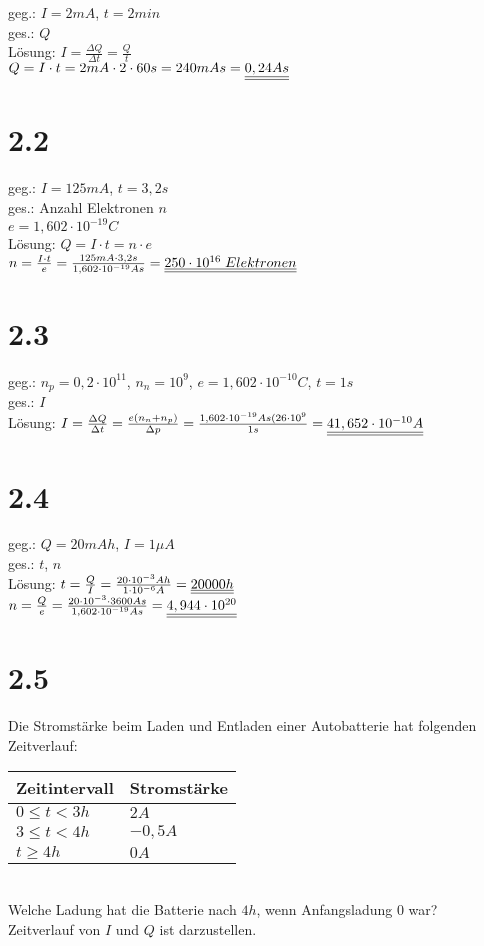 geg.: $I=2mA$, $t=2 min$\\
ges.: $Q$\\
Lösung: $\boxed{I=\frac{\Delta Q}{\Delta t}=\frac{Q}{t}}$\\
$Q=I\cdot t=2mA \cdot 2 \cdot 60s = 240 mAs = \underline{\underline{0,24 As}}$

\section*{2.2}

geg.: $I=125mA$, $t=3,2s$\\
ges.: Anzahl Elektronen $n$\\
$e = 1,602 \cdot 10^{-19}C$\\
Lösung: $Q=I\cdot t=n\cdot e$\\
$n=\frac{I\cdot t}{e}=\frac{125mA \cdot 3,2s}{1,602\cdot 10^{-19}As}=\underline{\underline{250\cdot 10^{16}\; Elektronen}}$

\section*{2.3}

geg.: $n_p=0,2\cdot 10^{11}$, $n_n=10^9$, $e=1,602\cdot 10^{-10} C$, $t=1s$\\
ges.: $I$\\
Lösung: $I=\frac{\Delta Q}{\Delta t}=\frac{e(n_n+n_p)}{\Delta p}=\frac{1,602\cdot 10^{-19}As(26\cdot 10^9}{1s}=\underline{\underline{41,652 \cdot 10^{-10}A}}$

\section*{2.4}

geg.: $Q=20mAh$, $I=1 \mu A$\\
ges.: $t$, $n$\\
Lösung: $t=\frac{Q}{I}=\frac{20\cdot 10^{-3}Ah}{1 \cdot 10^{-6}A}=\underline{\underline{20000h}}$\\
$n=\frac{Q}{e}=\frac{20\cdot 10^{-3}\cdot 3600 As}{1,602\cdot 10^{-19} As}=\underline{\underline{4,944\cdot 10^{20}}}$

\section*{2.5}
Die Stromstärke beim Laden und Entladen einer Autobatterie hat folgenden Zeitverlauf:\\
\begin{tabular}{l | l}
Zeitintervall & Stromstärke \\
\hline
$0 \leq t < 3h$ & $2A$\\
$3 \leq t < 4h$ & $-0,5A$\\
$t\geq 4h$ & $0A$
\end{tabular}\\
Welche Ladung hat die Batterie nach $4h$, wenn Anfangsladung $0$ war?\\
Zeitverlauf von $I$ und $Q$ ist darzustellen.

